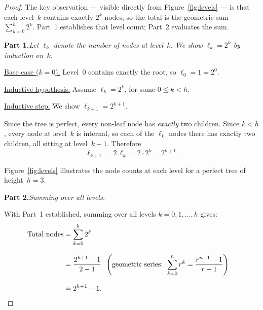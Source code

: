 \documentclass[12pt]{article}
\theoremstyle{definition}
\theoremstyle{plain}
\begin{document}
\begin{proof}
The key observation — visible directly from Figure~\ref{fig:levels}
— is that each level~$k$ contains exactly $2^{k}$ nodes, so the
total is the geometric sum $\sum_{k=0}^{h}2^{k}$.  Part~1 establishes
that level count; Part~2 evaluates the sum.

\medskip
\noindent\textbf{Part 1.}\enspace\emph{Let $\ell_k$ denote the number
of nodes at level~$k$.  We show $\ell_k = 2^{k}$ by induction on~$k$.}

\medskip
\noindent\underline{Base case ($k=0$).}\quad
Level~$0$ contains exactly the root, so $\ell_0 = 1 = 2^{0}$.

\medskip
\noindent\underline{Inductive hypothesis.}\quad
Assume $\ell_k = 2^{k}$, for some $0\le k<h$.

\medskip
\noindent\underline{Inductive step.}\quad
We show $\ell_{k+1} = 2^{k+1}$.

Since the tree is perfect, every non-leaf node has \emph{exactly} two
children.  Since $k<h$, every node at level~$k$ is internal, so each
of the $\ell_k$ nodes there has exactly two children, all sitting at
level~$k+1$.
Therefore
\[
  \ell_{k+1}
    = 2\,\ell_k
    = 2 \cdot 2^{k}
    = 2^{k+1}.
\]

\noindent
Figure~\ref{fig:levels} illustrates the node counts at each level for
a perfect tree of height~$h=3$.

\medskip
\noindent\textbf{Part 2.}\enspace\emph{Summing over all levels.}

\medskip
\noindent
With Part~1 established, summing over all levels $k=0,1,\ldots,h$
gives:
\begin{align*}
\text{Total nodes}
  &= \sum_{k=0}^{h} 2^{k} \\[8pt]
  &= \frac{2^{h+1}-1}{2-1}
     && \!\!\!\left(\text{geometric series: }
        \sum_{k=0}^{n}r^{k}=\frac{r^{n+1}-1}{r-1}\right) \\[8pt]
  &= 2^{h+1}-1.\qedhere
\end{align*}
\end{proof}
\end{document}
